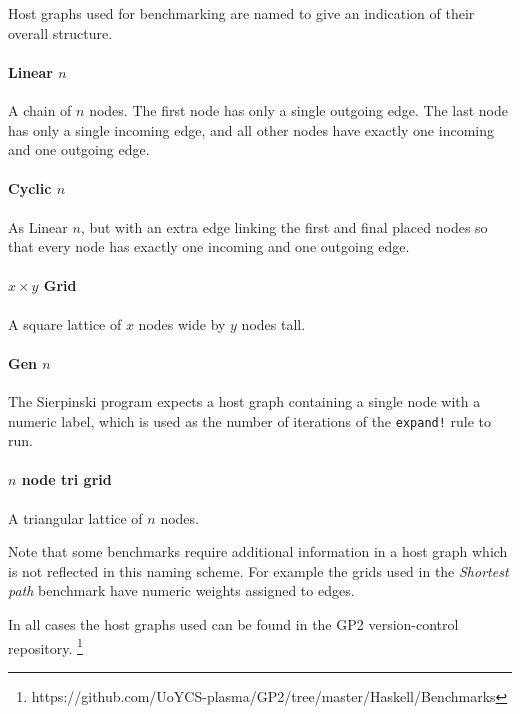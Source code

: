 Host graphs used for benchmarking are named to give an indication of their overall structure.


\paragraph*{Linear $n$}

A chain of $n$ nodes. The first node has only a single outgoing edge. The last node has only a single incoming edge, and all other nodes have exactly one incoming and one outgoing edge.

\paragraph*{Cyclic $n$}

As Linear $n$, but with an extra edge linking the first and final placed nodes so that every node has exactly one incoming and one outgoing edge.

\paragraph*{$x \times y$ Grid}

A square lattice of $x$ nodes wide by $y$ nodes tall.

\paragraph*{Gen $n$}

The Sierpinski program expects a host graph containing a single node with a numeric label, which is used as the number of iterations of the \texttt{expand!} rule to run.

\paragraph*{$n$ node tri grid}

A triangular lattice of $n$ nodes.


Note that some benchmarks require additional information in a host graph which is not reflected in this naming scheme. For example the grids used in the \textit{Shortest path} benchmark have numeric weights assigned to edges.

In all cases the host graphs used can be found in the GP2 version-control repository.
\footnote{https://github.com/UoYCS-plasma/GP2/tree/master/Haskell/Benchmarks} %



